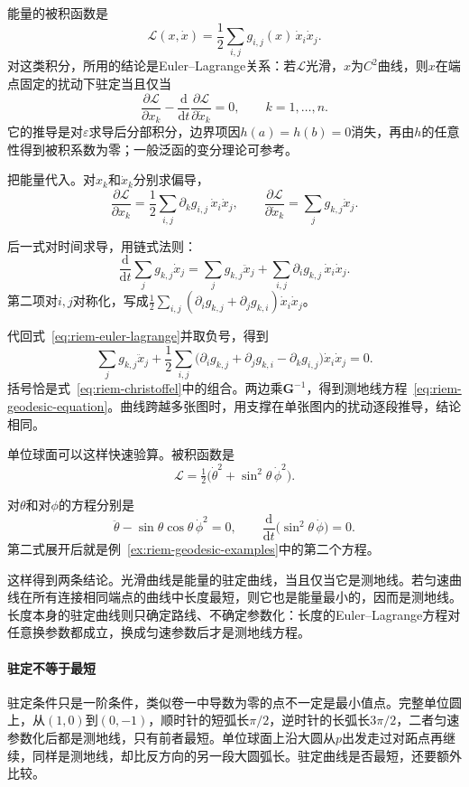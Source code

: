 能量的被积函数是
\[
\mathscr L(x,\dot x)=\frac12\sum_{i,j}g_{i,j}(x)\,\dot x_i\dot x_j .
\]
对这类积分，所用的结论是Euler--Lagrange关系：若$\mathscr L$光滑，$x$为$C^2$曲线，则$x$在端点固定的扰动下驻定当且仅当
\begin{equation}
\frac{\partial\mathscr L}{\partial x_k}-\frac{\mathrm d}{\mathrm dt}\frac{\partial\mathscr L}{\partial\dot x_k}=0,\qquad k=1,\ldots,n .
\label{eq:riem-euler-lagrange}
\end{equation}
它的推导是对$\varepsilon$求导后分部积分，边界项因$h(a)=h(b)=0$消失，再由$h$的任意性得到被积系数为零；一般泛函的变分理论可参考。

把能量代入。对$x_k$和$\dot x_k$分别求偏导，
\[
\frac{\partial\mathscr L}{\partial x_k}=\frac12\sum_{i,j}\partial_kg_{i,j}\,\dot x_i\dot x_j,\qquad
\frac{\partial\mathscr L}{\partial\dot x_k}=\sum_jg_{k,j}\dot x_j .
\]

后一式对时间求导，用链式法则：
\[
\frac{\mathrm d}{\mathrm dt}\sum_jg_{k,j}\dot x_j=\sum_jg_{k,j}\ddot x_j+\sum_{i,j}\partial_ig_{k,j}\,\dot x_i\dot x_j .
\]
第二项对$i,j$对称化，写成$\frac12\sum_{i,j}(\partial_ig_{k,j}+\partial_jg_{k,i})\dot x_i\dot x_j$。

代回式~\eqref{eq:riem-euler-lagrange}并取负号，得到
\[
\sum_jg_{k,j}\ddot x_j+\frac12\sum_{i,j}\bigl(\partial_ig_{k,j}+\partial_jg_{k,i}-\partial_kg_{i,j}\bigr)\dot x_i\dot x_j=0 .
\]
括号恰是式~\eqref{eq:riem-christoffel}中的组合。两边乘$\bm G^{-1}$，得到测地线方程~\eqref{eq:riem-geodesic-equation}。曲线跨越多张图时，用支撑在单张图内的扰动逐段推导，结论相同。

单位球面可以这样快速验算。被积函数是
\[
\mathscr L=\tfrac12\bigl(\dot\theta^2+\sin^2\theta\,\dot\phi^2\bigr).
\]

对$\theta$和对$\phi$的方程分别是
\[
\ddot\theta-\sin\theta\cos\theta\,\dot\phi^2=0,\qquad
\frac{\mathrm d}{\mathrm dt}\bigl(\sin^2\theta\,\dot\phi\bigr)=0 .
\]
第二式展开后就是例~\ref{ex:riem-geodesic-examples}中的第二个方程。

这样得到两条结论。光滑曲线是能量的驻定曲线，当且仅当它是测地线。若匀速曲线在所有连接相同端点的曲线中长度最短，则它也是能量最小的，因而是测地线。长度本身的驻定曲线则只确定路线、不确定参数化：长度的Euler--Lagrange方程对任意换参数都成立，换成匀速参数后才是测地线方程。

\paragraph{驻定不等于最短}
驻定条件只是一阶条件，类似卷一中导数为零的点不一定是最小值点。完整单位圆上，从$(1,0)$到$(0,-1)$，顺时针的短弧长$\pi/2$，逆时针的长弧长$3\pi/2$，二者匀速参数化后都是测地线，只有前者最短。单位球面上沿大圆从$p$出发走过对跖点再继续，同样是测地线，却比反方向的另一段大圆弧长。驻定曲线是否最短，还要额外比较。


